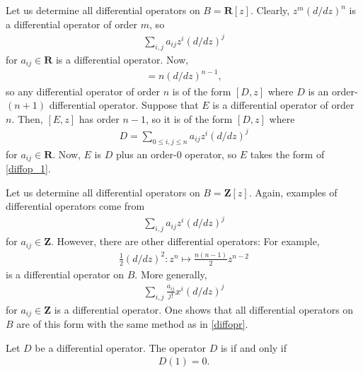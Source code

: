 \documentclass [11 pt, oneside] {article}
\begin{document}
\begin{example}[ ]\label{diffopr}\text{}
Let us determine all differential operators on $B=\mathbf{R}[z]$.
Clearly, $z^m(d/dz)^n$ is a differential operator of order $m$, so
\begin{align}\label{diffop_1}
	\sum_{i,j}^{} a_{ij}z^i(d/dz) ^j
\end{align}
for $a_{ij}\in \mathbf{R}$ is a differential operator.
Now, 
\begin{align*}
	[(d/dz) ^n,z] = n(d/dz) ^{n-1},
\end{align*}
so any differential operator of order $n$ is of the form $[D,z]$ where $D$ is an order-$(n+1)$ differential operator.
Suppose that $E$ is a differential operator of order $n$. Then, $[E,z]$ has order $n-1$, so it is of the form $[D,z]$ where 
\begin{align*}
	D = \sum_{0\le i,j\le n}^{} a_{ij}z^i(d/dz) ^j
\end{align*}
for $a_{ij}\in \mathbf{R}$.
Now, $E$ is $D$ plus an order-$0$ operator, so $E$ takes the form of \cref{diffop_1}.
\end{example}

\begin{example}[ ]\label{}\text{}
Let us determine all differential operators on $B=\mathbf{Z}[z]$.
Again, examples of differential operators come from
\begin{align*}\label{diffop_2}
	\sum_{i,j}^{} a_{ij} z^i(d/dz) ^j
\end{align*}
for $a_{ij}\in \mathbf{Z}$.
However, there are other differential operators: For example,
\begin{align*}
	\frac{1}{2}(d/dz)^2 : z^n \longmapsto \frac{n(n-1)}{2}z^{n-2}
\end{align*}
is a differential operator on $B$.
More generally,
\begin{align*}
	\sum_{i,j}^{} \frac{a_{ij}}{j!}x^i(d/dz) ^j
\end{align*}
for $a_{ij}\in \mathbf{Z}$ is a differential operator.
One shows that all differential operators on $B$ are of this form with the same method as in \cref{diffopr}.
\end{example}

\begin{definition}[ ]\label{}\text{}
	Let $D$ be a differential operator. The operator $D$ is  if and only if 
	\begin{align*}
		D(1)=0.
	\end{align*}
\end{definition}
\end{document}
